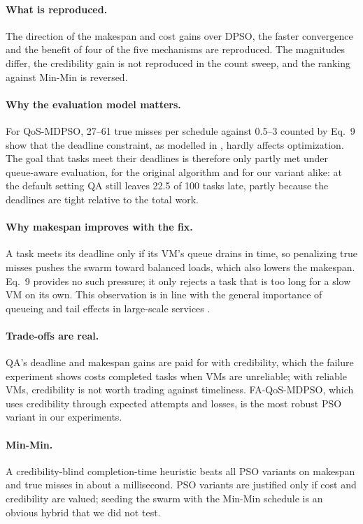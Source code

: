 \documentclass[pdflatex,sn-basic]{sn-jnl}
\theoremstyle{thmstyleone}%
\theoremstyle{thmstyletwo}%
\theoremstyle{thmstylethree}%
\begin{document}
\paragraph{What is reproduced.} The direction of the makespan and cost gains over DPSO, the faster convergence and the benefit of four of the five mechanisms are reproduced. The magnitudes differ, the credibility gain is not reproduced in the count sweep, and the ranking against Min-Min is reversed.

\paragraph{Why the evaluation model matters.} For QoS-MDPSO, 27--61 true misses per schedule against 0.5--3 counted by Eq.~9 show that the deadline constraint, as modelled in \citet{ouyang2025}, hardly affects optimization. The goal that tasks meet their deadlines is therefore only partly met under queue-aware evaluation, for the original algorithm and for our variant alike: at the default setting QA still leaves 22.5 of 100 tasks late, partly because the deadlines are tight relative to the total work.

\paragraph{Why makespan improves with the fix.} A task meets its deadline only if its VM's queue drains in time, so penalizing true misses pushes the swarm toward balanced loads, which also lowers the makespan. Eq.~9 provides no such pressure; it only rejects a task that is too long for a slow VM on its own. This observation is in line with the general importance of queueing and tail effects in large-scale services \citep{dean2013}.

\paragraph{Trade-offs are real.} QA's deadline and makespan gains are paid for with credibility, which the failure experiment shows costs completed tasks when VMs are unreliable; with reliable VMs, credibility is not worth trading against timeliness. FA-QoS-MDPSO, which uses credibility through expected attempts and losses, is the most robust PSO variant in our experiments.

\paragraph{Min-Min.} A credibility-blind completion-time heuristic beats all PSO variants on makespan and true misses in about a millisecond. PSO variants are justified only if cost and credibility are valued; seeding the swarm with the Min-Min schedule is an obvious hybrid that we did not test.
\end{document}
